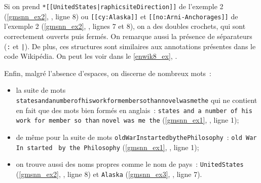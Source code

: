 Si on prend \lstinline!*[[UnitedStates|raphicsiteDirection]]! de l'exemple 2 (\autoref{gmsnn_ex2}, , ligne 8) ou 
\lstinline![[cy:Alaska]]! et \lstinline![[no:Arni-Anchorages]]! de l'exemple 2 (\autoref{gmsnn_ex2}, , lignes 7 et 8), on a des doubles crochets, qui sont correctement ouverts puis fermés. On remarque aussi la présence de séparateurs (\lstinline!:! et \lstinline!|!). De plus, ces structures sont similaires aux annotations présentes dans le code Wikipédia.
On peut les voir dans le \autoref{enwik8_ex}, .

Enfin, malgré l'absence d'espaces, on discerne de nombreux mots~:
\begin{itemize}
	\item la suite de mots \lstinline!statesandanumberofhisworkformembersothannovelwasmethe! qui ne contient en fait que des mots bien formés en anglais~: \lstinline!states and a number of his work for member so than! \lstinline!novel was me the! (\autoref{gmsnn_ex1}, , ligne 1);
	\item de même pour la suite de mots \lstinline!oldWarInstartedbythePhilosophy!~: \lstinline!old War In started! \lstinline! by the Philosophy!
	(\autoref{gmsnn_ex1}, , ligne 1);
	\item on trouve aussi des noms propres comme le nom de pays~: \lstinline!UnitedStates! (\autoref{gmsnn_ex2}, , ligne 8) et \lstinline!Alaska! (\autoref{gmsnn_ex3}, , ligne 7).
\end{itemize}